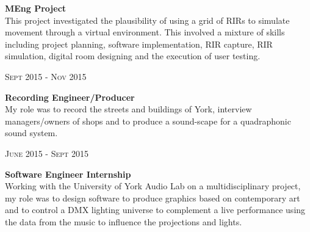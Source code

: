 \documentclass[10pt]{article}
\begin{document}
\begin{minipage}[t]{0.74\textwidth}
    \hspace{-6mm}
    
    {\bf{MEng Project}}\\

    This project investigated the plausibility of using a grid of RIRs to simulate movement through a virtual environment. This involved a mixture of skills including project planning, software implementation, RIR capture, RIR simulation, digital room designing and the execution of user testing.
    
    
    \begin{center}
    	{\textsc{Sept 2015 - Nov 2015}}\\
    \end{center}
    \raggedright{\bf{Recording Engineer/Producer}}\\
    My role was to record the streets and buildings of York, interview managers/owners of shops and to produce a sound-scape for a quadraphonic sound system.\\
    
    \begin{center}
    	{\textsc{June 2015 - Sept 2015}}\\
    \end{center}

    \raggedright{\bf{Software Engineer Internship}}\\
    Working with the University of York Audio Lab on a multidisciplinary project, my role was to design software to produce graphics based on contemporary art and to control a DMX lighting universe to complement a live performance using the data from the music to influence the projections and lights. \\


\end{minipage}
\end{document}
